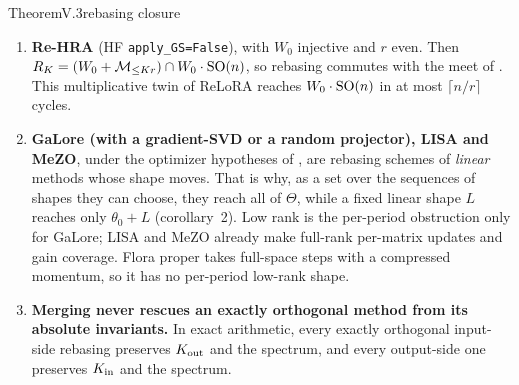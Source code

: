 \begin{restate}{Theorem}{V.3}{rebasing closure}
\begin{enumerate}[label=\arabic*.,leftmargin=1.6em]
  has components of size $b\,2^{m'-1}$. For injective $W_0$ this is $\diag(\R^m)\cdot W_0\cdot\SO(n)$ iff
  $b\,2^{m'-1}=n$, the full-depth butterfly $m'=1+\log_2(n/b)$. HF's default \texttt{boft\_\allowbreak n\_\allowbreak butterfly\_\allowbreak factor=1} is
  block OFT times $\diag(s)$. A \emph{single} full-depth BOFT has dimension at most $m'\tfrac nb\binom b2$, which is below
  $\dim\SO(n)$ when $m'(b-1)<n-1$; its matrices are dense, while the set they form has positive codimension.
  \item \textbf{Re-HRA} (HF \texttt{apply\_GS=False}), with $W_0$ injective and $r$ even. Then
  $R_K=(W_0+\mathcal{M}_{\le Kr})\cap W_0\cdot\mathrm{SO}(n)$, so rebasing commutes with the meet of . This
  multiplicative twin of ReLoRA reaches $W_0\cdot\mathrm{SO}(n)$ in at most $\lceil n/r\rceil$ cycles.
  \item \textbf{GaLore (with a gradient-SVD or a random projector), LISA and MeZO}, under the optimizer hypotheses of
  , are rebasing schemes of \emph{linear} methods whose shape moves. That is why, as a set over
  the sequences of shapes they can choose, they reach all of $\Theta$, while a fixed linear shape $L$ reaches only
  $\theta_0+L$ (corollary~2). Low rank is the per-period obstruction only for GaLore; LISA and MeZO already make full-rank
  per-matrix updates and gain coverage. Flora proper takes full-space steps with a compressed momentum, so it has no
  per-period low-rank shape.
  \item \textbf{Merging never rescues an exactly orthogonal method from its absolute invariants.} In exact arithmetic,
  every exactly orthogonal input-side rebasing preserves $K_{\rm out}$ and the spectrum, and every output-side one
  preserves $K_{\rm in}$ and the spectrum.
\end{enumerate}
\end{restate}

